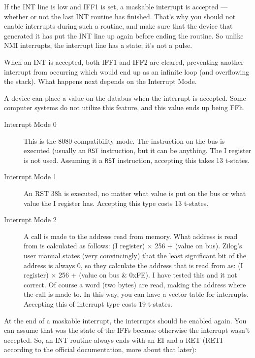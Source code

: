 \documentclass[oneside,a4paper]{book}
\begin{document}
If the INT line is low and IFF1 is set, a maskable interrupt is accepted --- 
whether or not the last INT routine has finished. That's why you should 
not enable interrupts during such a routine, and make sure that the device 
that generated it has put the INT line up again before ending the routine.
So unlike NMI interrupts, the interrupt line has a state; it's not a pulse.

When an INT is accepted, both IFF1 and IFF2 are cleared, preventing another 
interrupt from occurring which would end up as an infinite loop (and overflowing
the stack). What happens next depends on the Interrupt Mode.

A device can place a value on the databus when the interrupt is accepted. Some
computer systems do not utilize this feature, and this value ends up 
being FFh.

\begin{description}

\item[Interrupt Mode 0]
  This is the 8080 compatibility mode. The instruction on the bus is executed 
  (usually an {\tt RST} instruction, but it can be anything.  The I 
  register is not used. Assuming it a {\tt RST} instruction, accepting
  this takes 13 t-states.

\item[Interrupt Mode 1]
  An RST 38h is executed, no matter what value is put on the
  bus or what value the I register has. Accepting this type costs 13 t-states.

\item[Interrupt Mode 2]
  A call is made to the address read from memory. What address is
  read from is calculated as follows: (I register) $\times$ 256 + 
  (value on bus). Zilog's user manual states (very convincingly) that the 
  least significant bit of the address is always 0, so they calculate the 
  address that is read from as: (I register) $\times$ 256 + (value on bus \& 0xFE). 
  I have tested this and it not correct. Of course a word (two bytes) are read, 
  making the address where the call is made to. In this way, you can have a vector 
  table for interrupts. Accepting this of interrupt type costs 19 t-states.

\end{description}

At the end of a maskable interrupt, the interrupts should be enabled again. 
You can assume that was the state of the IFFs because otherwise the interrupt 
wasn't accepted. So, an INT routine always ends with an {\ttfamily EI} and 
a {\ttfamily RET} ({\ttfamily RETI} according to the official documentation,
more about that later):
\end{document}
